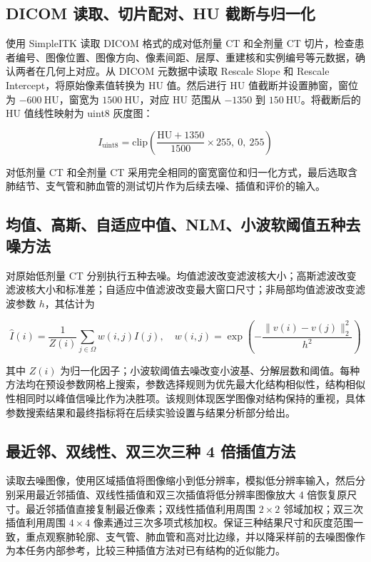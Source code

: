 \documentclass[10.5pt,compsoc,UTF8]{CjC}
\theoremstyle{mystyle}
\begin{document}
\subsection{DICOM 读取、切片配对、HU 截断与归一化}

使用 SimpleITK 读取 DICOM 格式的成对低剂量 CT 和全剂量 CT 切片，检查患者编号、图像位置、图像方向、像素间距、层厚、重建核和实例编号等元数据，确认两者在几何上对应。从 DICOM 元数据中读取 Rescale Slope 和 Rescale Intercept，将原始像素值转换为 HU 值。然后进行 HU 值截断并设置肺窗，窗位为 \(-600\ \mathrm{HU}\)，窗宽为 \(1500\ \mathrm{HU}\)，对应 HU 范围从 \(-1350\) 到 \(150\ \mathrm{HU}\)。将截断后的 HU 值线性映射为 uint8 灰度图：

\begin{equation}
I_{\mathrm{uint8}}=\mathrm{clip}\left(\frac{\mathrm{HU}+1350}{1500}\times255,\ 0,\ 255\right)
\end{equation}

对低剂量 CT 和全剂量 CT 采用完全相同的窗宽窗位和归一化方式，最后选取含肺结节、支气管和肺血管的测试切片作为后续去噪、插值和评价的输入。

\subsection{均值、高斯、自适应中值、NLM、小波软阈值五种去噪方法}

对原始低剂量 CT 分别执行五种去噪。均值滤波改变滤波核大小；高斯滤波改变滤波核大小和标准差；自适应中值滤波改变最大窗口尺寸；非局部均值滤波改变滤波参数 \(h\)，其估计为

\begin{equation}
\hat{I}(i)=\frac{1}{Z(i)}\sum_{j\in \Omega} w(i,j)I(j),\quad
w(i,j)=\exp\left(-\frac{\|v(i)-v(j)\|_2^2}{h^2}\right)
\end{equation}

其中 \(Z(i)\) 为归一化因子；小波软阈值去噪改变小波基、分解层数和阈值。每种方法均在预设参数网格上搜索，参数选择规则为优先最大化结构相似性，结构相似性相同时以峰值信噪比作为决胜项。该规则体现医学图像对结构保持的重视，具体参数搜索结果和最终指标将在后续实验设置与结果分析部分给出。

\subsection{最近邻、双线性、双三次三种 4 倍插值方法}

读取去噪图像，使用区域插值将图像缩小到低分辨率，模拟低分辨率输入，然后分别采用最近邻插值、双线性插值和双三次插值将低分辨率图像放大 4 倍恢复原尺寸。最近邻插值直接复制最近像素；双线性插值利用周围 \(2\times2\) 邻域加权；双三次插值利用周围 \(4\times4\) 像素通过三次多项式核加权。保证三种结果尺寸和灰度范围一致，重点观察肺轮廓、支气管、肺血管和高对比边缘，并以降采样前的去噪图像作为本任务内部参考，比较三种插值方法对已有结构的近似能力。
\end{document}

